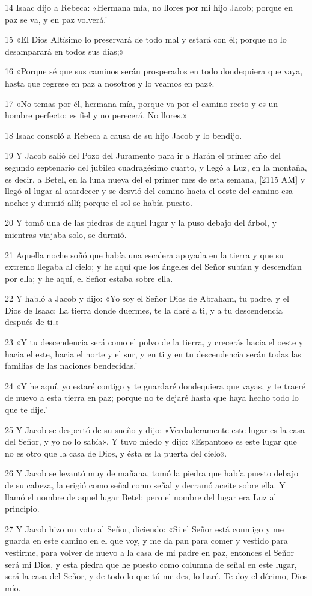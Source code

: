 \par 14 Isaac dijo a Rebeca: «Hermana mía, no llores por mi hijo Jacob; porque en paz se va, y en paz volverá.'
\par 15 «El Dios Altísimo lo preservará de todo mal y estará con él; porque no lo desamparará en todos sus días;»
\par 16 «Porque sé que sus caminos serán prosperados en todo dondequiera que vaya, hasta que regrese en paz a nosotros y lo veamos en paz».
\par 17 «No temas por él, hermana mía, porque va por el camino recto y es un hombre perfecto; es fiel y no perecerá. No llores.»
\par 18 Isaac consoló a Rebeca a causa de su hijo Jacob y lo bendijo.
\par 19 Y Jacob salió del Pozo del Juramento para ir a Harán el primer año del segundo septenario del jubileo cuadragésimo cuarto, y llegó a Luz, en la montaña, es decir, a Betel, en la luna nueva del el primer mes de esta semana, [2115 AM] y llegó al lugar al atardecer y se desvió del camino hacia el oeste del camino esa noche: y durmió allí; porque el sol se había puesto.
\par 20 Y tomó una de las piedras de aquel lugar y la puso debajo del árbol, y mientras viajaba solo, se durmió.
\par 21 Aquella noche soñó que había una escalera apoyada en la tierra y que su extremo llegaba al cielo; y he aquí que los ángeles del Señor subían y descendían por ella; y he aquí, el Señor estaba sobre ella.
\par 22 Y habló a Jacob y dijo: «Yo soy el Señor Dios de Abraham, tu padre, y el Dios de Isaac; La tierra donde duermes, te la daré a ti, y a tu descendencia después de ti.»
\par 23 «Y tu descendencia será como el polvo de la tierra, y crecerás hacia el oeste y hacia el este, hacia el norte y el sur, y en ti y en tu descendencia serán todas las familias de las naciones bendecidas.'
\par 24 «Y he aquí, yo estaré contigo y te guardaré dondequiera que vayas, y te traeré de nuevo a esta tierra en paz; porque no te dejaré hasta que haya hecho todo lo que te dije.'
\par 25 Y Jacob se despertó de su sueño y dijo: «Verdaderamente este lugar es la casa del Señor, y yo no lo sabía». Y tuvo miedo y dijo: «Espantoso es este lugar que no es otro que la casa de Dios, y ésta es la puerta del cielo».
\par 26 Y Jacob se levantó muy de mañana, tomó la piedra que había puesto debajo de su cabeza, la erigió como señal como señal y derramó aceite sobre ella. Y llamó el nombre de aquel lugar Betel; pero el nombre del lugar era Luz al principio.
\par 27 Y Jacob hizo un voto al Señor, diciendo: «Si el Señor está conmigo y me guarda en este camino en el que voy, y me da pan para comer y vestido para vestirme, para volver de nuevo a la casa de mi padre en paz, entonces el Señor será mi Dios, y esta piedra que he puesto como columna de señal en este lugar, será la casa del Señor, y de todo lo que tú me des, lo haré. Te doy el décimo, Dios mío.

